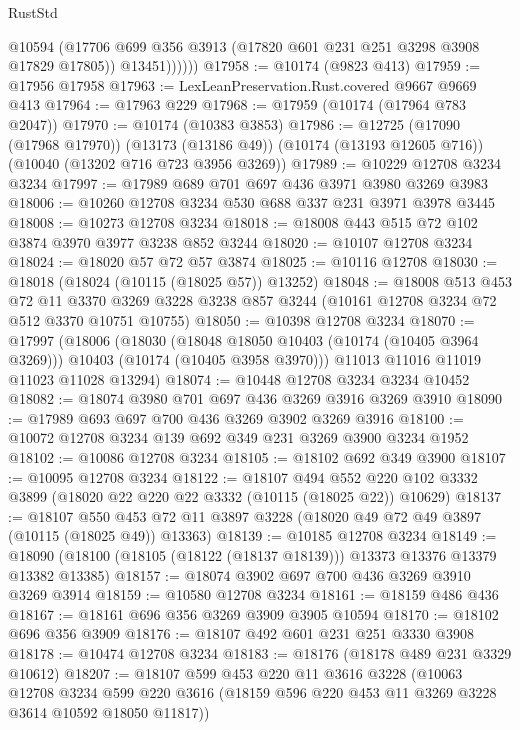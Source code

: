 \begin{lexlean}{RustStd}
\begin{coremodule}
                @10594
                (@17706 @699 @356 @3913 (@17820 @601 @231 @251 @3298 @3908 @17829 @17805))
                @13451))))))
@17958 := @10174 (@9823 @413)
@17959 := @17956 @17958
@17963 := LexLeanPreservation.Rust.covered @9667 @9669 @413
@17964 := @17963 @229
@17968 := @17959 (@10174 (@17964 @783 @2047))
@17970 := @10174 (@10383 @3853)
@17986 := @12725
    (@17090 (@17968 @17970))
    (@13173 (@13186 @49))
    (@10174 (@13193 @12605 @716))
    (@10040 (@13202 @716 @723 @3956 @3269))
@17989 := @10229 @12708 @3234 @3234
@17997 := @17989 @689 @701 @697 @436 @3971 @3980 @3269 @3983
@18006 := @10260 @12708 @3234 @530 @688 @337 @231 @3971 @3978 @3445
@18008 := @10273 @12708 @3234
@18018 := @18008 @443 @515 @72 @102 @3874 @3970 @3977 @3238 @852 @3244
@18020 := @10107 @12708 @3234
@18024 := @18020 @57 @72 @57 @3874
@18025 := @10116 @12708
@18030 := @18018 (@18024 (@10115 (@18025 @57)) @13252)
@18048 := @18008
    @513
    @453
    @72
    @11
    @3370
    @3269
    @3228
    @3238
    @857
    @3244
    (@10161 @12708 @3234 @72 @512 @3370 @10751 @10755)
@18050 := @10398 @12708 @3234
@18070 := @17997
    (@18006
      (@18030
        (@18048 @18050 @10403 (@10174 (@10405 @3964 @3269)))
        @10403
        (@10174 (@10405 @3958 @3970)))
      @11013
      @11016
      @11019
      @11023
      @11028
      @13294)
@18074 := @10448 @12708 @3234 @3234 @10452
@18082 := @18074 @3980 @701 @697 @436 @3269 @3916 @3269 @3910
@18090 := @17989 @693 @697 @700 @436 @3269 @3902 @3269 @3916
@18100 := @10072 @12708 @3234 @139 @692 @349 @231 @3269 @3900 @3234 @1952
@18102 := @10086 @12708 @3234
@18105 := @18102 @692 @349 @3900
@18107 := @10095 @12708 @3234
@18122 := @18107
    @494
    @552
    @220
    @102
    @3332
    @3899
    (@18020 @22 @220 @22 @3332 (@10115 (@18025 @22)) @10629)
@18137 := @18107
    @550
    @453
    @72
    @11
    @3897
    @3228
    (@18020 @49 @72 @49 @3897 (@10115 (@18025 @49)) @13363)
@18139 := @10185 @12708 @3234
@18149 := @18090 (@18100 (@18105 (@18122 (@18137 @18139))) @13373 @13376 @13379 @13382 @13385)
@18157 := @18074 @3902 @697 @700 @436 @3269 @3910 @3269 @3914
@18159 := @10580 @12708 @3234
@18161 := @18159 @486 @436
@18167 := @18161 @696 @356 @3269 @3909 @3905 @10594
@18170 := @18102 @696 @356 @3909
@18176 := @18107 @492 @601 @231 @251 @3330 @3908
@18178 := @10474 @12708 @3234
@18183 := @18176 (@18178 @489 @231 @3329 @10612)
@18207 := @18107
    @599
    @453
    @220
    @11
    @3616
    @3228
    (@10063
      @12708
      @3234
      @599
      @220
      @3616
      (@18159 @596 @220 @453 @11 @3269 @3228 @3614 @10592 @18050 @11817))

\end{coremodule}
\end{lexlean}
